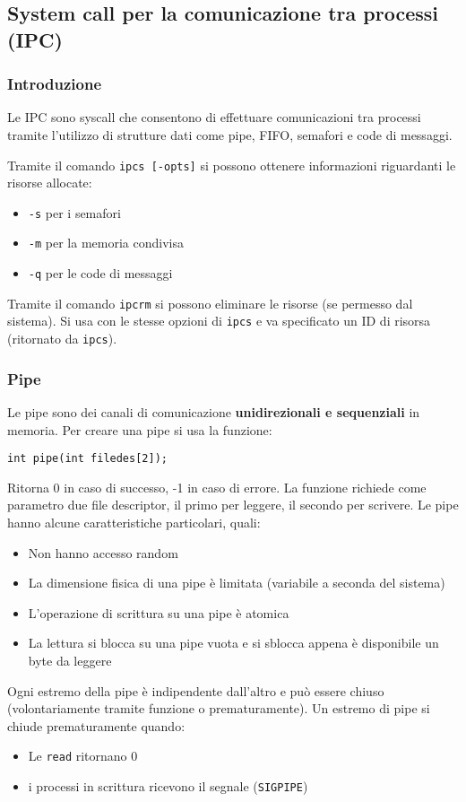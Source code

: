 \documentclass[a4paper, 10pt]{article}
\begin{document}
\subsection{System call per la comunicazione tra processi (IPC)}
\subsubsection{Introduzione}
Le IPC sono syscall che consentono di effettuare comunicazioni tra processi tramite l'utilizzo di strutture dati come pipe, FIFO, semafori e code di messaggi.

Tramite il comando \verb|ipcs [-opts]| si possono ottenere informazioni riguardanti le risorse allocate:
\begin{itemize}
\item \verb|-s| per i semafori
\item \verb|-m| per la memoria condivisa
\item \verb|-q| per le code di messaggi
\end{itemize}

Tramite il comando \verb|ipcrm| si possono eliminare le risorse (se permesso dal sistema). Si usa con le stesse opzioni di \verb|ipcs| e va specificato un ID di risorsa (ritornato da \verb|ipcs|).

\subsubsection{Pipe}
Le pipe sono dei canali di comunicazione \textbf{unidirezionali e sequenziali} in memoria. Per creare una pipe si usa la funzione:
\begin{verbatim}
int pipe(int filedes[2]);
\end{verbatim}
Ritorna 0 in caso di successo, -1 in caso di errore. La funzione richiede come parametro due file descriptor, il primo per leggere, il secondo per scrivere.
Le pipe hanno alcune caratteristiche particolari, quali:
\begin{itemize}
\item Non hanno accesso random
\item La dimensione fisica di una pipe è limitata (variabile a seconda del sistema)
\item L'operazione di scrittura su una pipe è atomica
\item La lettura si blocca su una pipe vuota e si sblocca appena è disponibile un byte da leggere
\end{itemize}
Ogni estremo della pipe è indipendente dall'altro e può essere chiuso (volontariamente tramite funzione o prematuramente).
Un estremo di pipe si chiude prematuramente quando:
\begin{itemize}
\item Le \verb|read| ritornano 0
\item i processi in scrittura ricevono il segnale (\verb|SIGPIPE|)
\end{itemize}
\end{document}
